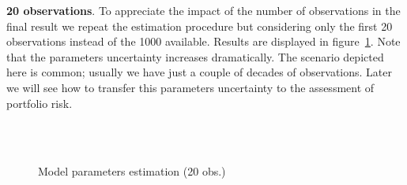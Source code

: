 \documentclass[11pt,fleqn]{book} %
\begin{document}
\begin{example}
	\textbf{20 observations}. To appreciate the impact of the number of 
	observations in the final result we repeat the estimation procedure 
	but considering only the first 20 observations instead of the 1000 
	available. Results are displayed in figure~\ref{fig:calib3}. Note 
	that the parameters uncertainty increases dramatically. The scenario 
	depicted here is common; usually we have just a couple of decades of 
	observations. Later we will see how to transfer this parameters 
	uncertainty to the assessment of portfolio risk.
	\begin{figure}[!ht]
		\centering
		\hfill
		\\
		\\
		\caption{Model parameters estimation (20 obs.)}
		\label{fig:calib3}
	\end{figure}

\end{example}
\end{document}
